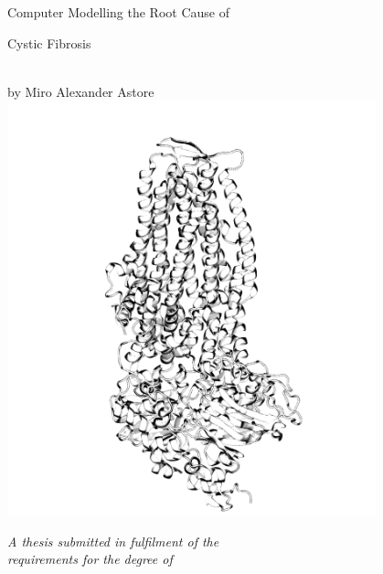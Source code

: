 
\begin{titlepage}

\begin{center}


\begin{LARGE}
Computer Modelling the Root Cause of  \\ 
\end{LARGE}
\vspace*{0.1in}
\begin{LARGE}
Cystic Fibrosis
\end{LARGE}
\begin{large} \\
\vspace{0.1in}
by Miro Alexander Astore
\includegraphics[width=0.8\textwidth]{figures/skeleton_bw.png}

\textit{A thesis submitted in fulfilment of the}\\
\textit{requirements for the degree of}

\vspace{0.1in}


\end{large}
\end{center}
\end{titlepage}
